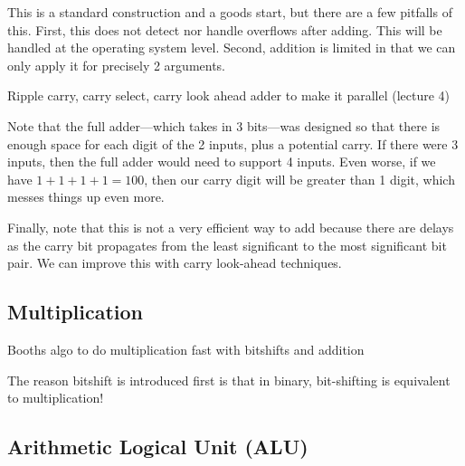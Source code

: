   \begin{corollary}
    
  \end{corollary}

  This is a standard construction and a goods start, but there are a few pitfalls of this. First, this does not detect nor handle overflows after adding. This will be handled at the operating system level. Second, addition is limited in that we can only apply it for precisely 2 arguments. 

  Ripple carry, carry select, carry look ahead adder to make it parallel (lecture 4)

  \begin{example}
    Note that the full adder---which takes in 3 bits---was designed so that there is enough space for each digit of the 2 inputs, plus a potential carry. If there were 3 inputs, then the full adder would need to support 4 inputs. Even worse, if we have $1 + 1 + 1 + 1 = 100$, then our carry digit will be greater than 1 digit, which messes things up even more. 
  \end{example}

  Finally, note that this is not a very efficient way to add because there are delays as the carry bit propagates from the least significant to the most significant bit pair. We can improve this with carry look-ahead techniques. 

\subsection{Multiplication} 

  Booths algo to do multiplication fast with bitshifts and addition 

  The reason bitshift is introduced first is that in binary, bit-shifting is equivalent to multiplication! 

  \begin{theorem}
    
  \end{theorem}

  \begin{theorem}
    
  \end{theorem}

\subsection{Arithmetic Logical Unit (ALU)}

